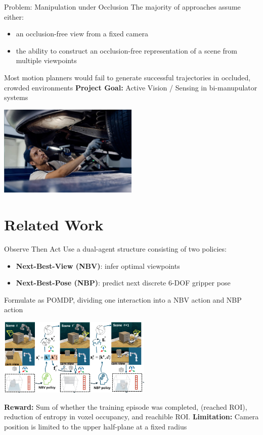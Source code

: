 \documentclass{beamer}
\begin{document}
\begin{frame}[t]{Problem: Manipulation under Occlusion}
    The majority of approaches assume either:
    \begin{itemize}[label=-]
        \item an occlusion-free view from a fixed camera
        \item the ability to construct an occlusion-free representation of a scene from multiple viewpoints 
    \end{itemize}
    Most motion planners would fail to generate successful trajectories in occluded, crowded environments 
    \pause
    \newline
    \textbf{Project Goal:} Active Vision / Sensing in bi-manupulator systems 
    \begin{center}
    \includegraphics[width=0.5\textwidth]{./img/motivation_2.png}
    \end{center}

    
\end{frame}



\section{Related Work}
\begin{frame}[t]{Observe Then Act}
    \small
    Use a dual-agent structure consisting of two policies: 
    \begin{itemize}
        \item \textbf{Next-Best-View (NBV)}: infer optimal viewpoints 
        \item \textbf{Next-Best-Pose (NBP)}: predict next discrete 6-DOF gripper pose 
    \end{itemize}
    \pause
    Formulate as POMDP, dividing one interaction into a NBV action and NBP action
    \begin{center}
    \includegraphics[width=0.55\textwidth]{./img/observe_then_act_0.png}
    \end{center}
    \textbf{Reward:} Sum of whether the training episode was completed, (reached ROI), reduction of entropy in voxel occupancy, and reachible ROI.
    \pause
    \newline
    \textbf{Limitation:} Camera position is limited to the upper half-plane at a fixed radius
\end{frame}
\end{document}
